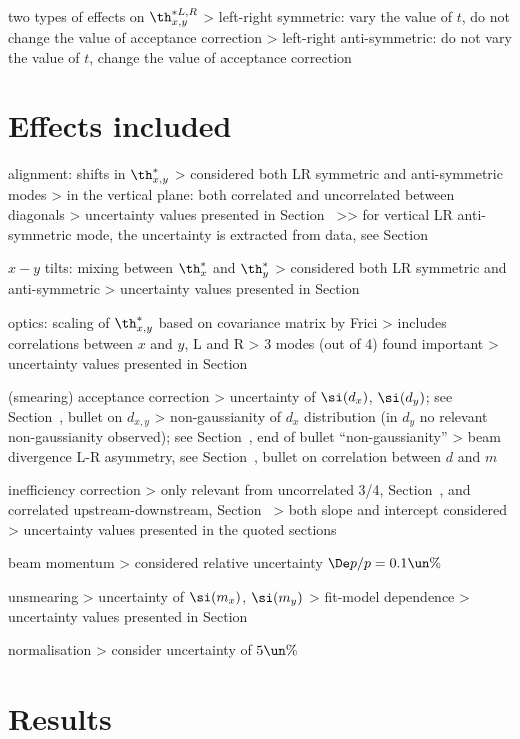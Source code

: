 \> two types of effects on $\th^{*L,R}_{x, y}$
\>> left-right symmetric: vary the value of $t$, do not change the value of acceptance correction
\>> left-right anti-symmetric: do not vary the value of $t$, change the value of acceptance correction


\section[systematics-effects]{Effects included}

\> alignment: shifts in $\th^*_{x,y}$
\>> considered both LR symmetric and anti-symmetric modes
\>> in the vertical plane: both correlated and uncorrelated between diagonals
\>> uncertainty values presented in Section~
\>>> for vertical LR anti-symmetric mode, the uncertainty is extracted from data, see Section~

\> $x-y$ tilts: mixing between $\th^*_{x}$ and $\th^*_{y}$
\>> considered both LR symmetric and anti-symmetric
\>> uncertainty values presented in Section~

\> optics: scaling of $\th^*_{x,y}$ based on covariance matrix by Frici
\>> includes correlations between $x$ and $y$, L and R
\>> 3 modes (out of 4) found important
\>> uncertainty values presented in Section~

\> (smearing) acceptance correction
\>> uncertainty of $\si(d_x)$, $\si(d_y)$; see Section~, bullet on $d_{x,y}$
\>> non-gaussianity of $d_x$ distribution (in $d_y$ no relevant non-gaussianity observed); see Section~, end of bullet ``non-gaussianity''
\>> beam divergence L-R asymmetry, see Section~, bullet on correlation between $d$ and $m$

\> inefficiency correction
\>> only relevant from uncorrelated 3/4, Section~, and correlated upstream-downstream, Section~
\>> both slope and intercept considered
\>> uncertainty values presented in the quoted sections

\> beam momentum
\>> considered relative uncertainty $\De p/p = 0.1\un{\%}$

\> unsmearing
\>> uncertainty of $\si(m_x)$, $\si(m_y)$
\>> fit-model dependence
\>> uncertainty values presented in Section~

\> normalisation
\>> consider uncertainty of $5\un{\%}$


\section[systematics-results]{Results}

